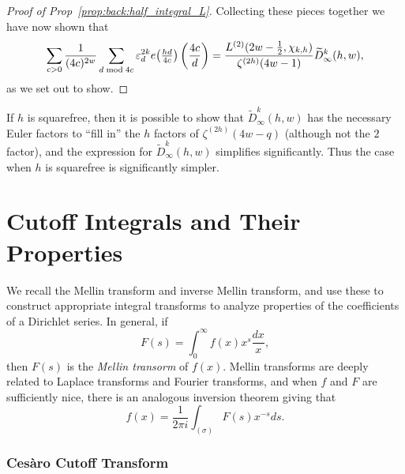 \begin{proof}[Proof of Prop~\ref{prop:back:half_integral_L}]
  Collecting these pieces together we have now shown that
  \begin{equation}
    \sum_{c > 0} \frac{1}{(4c)^{2w}} \sum_{d \bmod 4c} \varepsilon_d^{2k} e \big( \tfrac{hd}{4c} \big) \left(\frac{4c}{d}\right)
    =
    \frac{L^{(2)} (2w - \frac{1}{2}, \chi_{k,h})}{\zeta^{(2h)}(4w-1)}
    \widetilde{D}_\infty^k(h,w),
  \end{equation}
  as we set out to show.
%
\end{proof}


\begin{remark}
  If $h$ is squarefree, then it is possible to show that $\widetilde{D}_\infty^k(h,w)$ has
  the necessary Euler factors to ``fill in'' the $h$ factors of $\zeta^{(2h)}(4w - q)$
  (although not the $2$ factor), and the expression for $\widetilde{D}_\infty^k(h,w)$
  simplifies significantly.
  Thus the case when $h$ is squarefree is significantly simpler.
\end{remark}



\section{Cutoff Integrals and Their Properties}\label{sec:cutoff_integrals}


We recall the Mellin transform and inverse Mellin transform, and use these to construct
appropriate integral transforms to analyze properties of the coefficients of a Dirichlet
series.
In general, if
\begin{equation}
  F(s) = \int_0^\infty f(x) x^s \frac{dx}{x},
\end{equation}
then $F(s)$ is the \emph{Mellin transorm} of $f(x)$.
Mellin transforms are deeply related to Laplace transforms and Fourier transforms, and
when $f$ and $F$ are sufficiently nice, there is an analogous inversion theorem giving
that
\begin{equation}
  f(x) = \frac{1}{2\pi i} \int_{(\sigma)} F(s) x^{-s} ds.
\end{equation}



\subsubsection*{Ces\`{a}ro Cutoff Transform}


